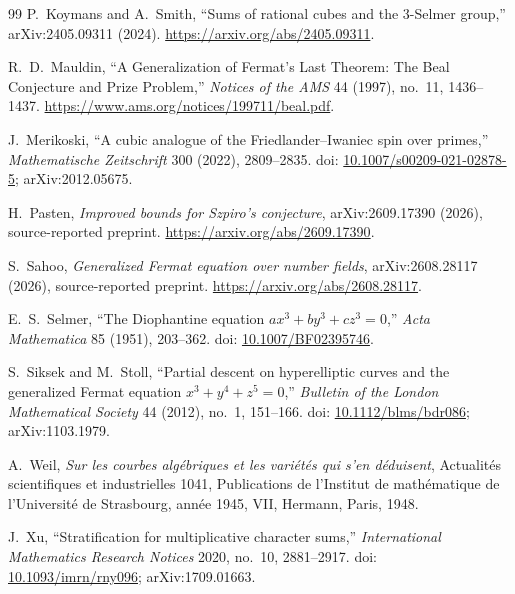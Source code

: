 \documentclass[11pt,a4paper]{article}
\begin{document}
\begin{thebibliography}{99}
P.~Koymans and A.~Smith, ``Sums of rational cubes and the $3$-Selmer group,'' arXiv:2405.09311 (2024).
\url{https://arxiv.org/abs/2405.09311}.

R.~D.~Mauldin, ``A Generalization of Fermat's Last Theorem: The Beal Conjecture and Prize Problem,''
\emph{Notices of the AMS} 44 (1997), no.\ 11, 1436--1437.
\url{https://www.ams.org/notices/199711/beal.pdf}.

J.~Merikoski, ``A cubic analogue of the Friedlander--Iwaniec spin over primes,''
\emph{Mathematische Zeitschrift} 300 (2022), 2809--2835.
doi: \href{https://doi.org/10.1007/s00209-021-02878-5}{10.1007/s00209-021-02878-5};
arXiv:2012.05675.

H.~Pasten, \emph{Improved bounds for Szpiro's conjecture},
arXiv:2609.17390 (2026), source-reported preprint.
\url{https://arxiv.org/abs/2609.17390}.

S.~Sahoo, \emph{Generalized Fermat equation over number fields},
arXiv:2608.28117 (2026), source-reported preprint.
\url{https://arxiv.org/abs/2608.28117}.

E.~S.~Selmer, ``The Diophantine equation $ax^3+by^3+cz^3=0$,''
\emph{Acta Mathematica} 85 (1951), 203--362. doi:
\href{https://doi.org/10.1007/BF02395746}{10.1007/BF02395746}.

S.~Siksek and M.~Stoll, ``Partial descent on hyperelliptic curves and the generalized Fermat equation $x^3+y^4+z^5=0$,''
\emph{Bulletin of the London Mathematical Society} 44 (2012), no.\ 1, 151--166.
doi: \href{https://doi.org/10.1112/blms/bdr086}{10.1112/blms/bdr086};
arXiv:1103.1979.

A.~Weil, \emph{Sur les courbes algébriques et les variétés qui s'en déduisent},
Actualités scientifiques et industrielles 1041,
Publications de l'Institut de mathématique de l'Université de Strasbourg,
année 1945, VII, Hermann, Paris, 1948.

J.~Xu, ``Stratification for multiplicative character sums,''
\emph{International Mathematics Research Notices} 2020, no.\ 10, 2881--2917.
doi: \href{https://doi.org/10.1093/imrn/rny096}{10.1093/imrn/rny096};
arXiv:1709.01663.

\end{thebibliography}
\endgroup
\end{document}
